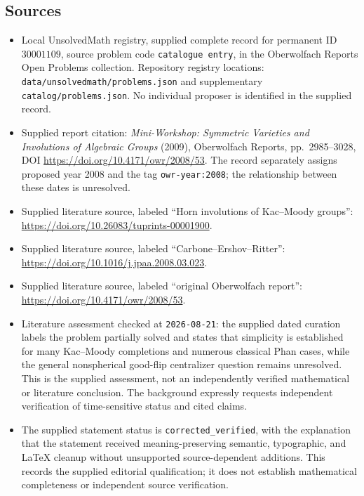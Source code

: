 \documentclass[11pt]{article}
\begin{document}
\subsection{Sources}
\begin{itemize}
\item Local UnsolvedMath registry, supplied complete record for permanent ID \(30001109\), source problem code \texttt{catalogue entry}, in the Oberwolfach Reports Open Problems collection. Repository registry locations: \texttt{data/unsolvedmath/problems.json} and supplementary \texttt{catalog/problems.json}. No individual proposer is identified in the supplied record.
\item Supplied report citation: \emph{Mini-Workshop: Symmetric Varieties and Involutions of Algebraic Groups} (2009), Oberwolfach Reports, pp.~2985--3028, DOI \url{https://doi.org/10.4171/owr/2008/53}. The record separately assigns proposed year 2008 and the tag \texttt{owr-year:2008}; the relationship between these dates is unresolved.
\item Supplied literature source, labeled ``Horn involutions of Kac--Moody groups'': \url{https://doi.org/10.26083/tuprints-00001900}.
\item Supplied literature source, labeled ``Carbone--Ershov--Ritter'': \url{https://doi.org/10.1016/j.jpaa.2008.03.023}.
\item Supplied literature source, labeled ``original Oberwolfach report'': \url{https://doi.org/10.4171/owr/2008/53}.
\item Literature assessment checked at \texttt{2026-08-21}: the supplied dated curation labels the problem partially solved and states that simplicity is established for many Kac--Moody completions and numerous classical Phan cases, while the general nonspherical good-flip centralizer question remains unresolved. This is the supplied assessment, not an independently verified mathematical or literature conclusion. The background expressly requests independent verification of time-sensitive status and cited claims.
\item The supplied statement status is \texttt{corrected\_verified}, with the explanation that the statement received meaning-preserving semantic, typographic, and LaTeX cleanup without unsupported source-dependent additions. This records the supplied editorial qualification; it does not establish mathematical completeness or independent source verification.
\end{itemize}
\end{document}
